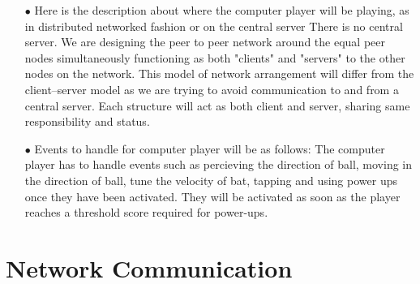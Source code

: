 \documentclass[10pt]{asme2ej}
\begin{document}
\begin{itemize}
 \item [$\bullet$]
 Here is the description about where the computer player will be playing, as in distributed networked fashion or on the central server There is no central server. We are designing the peer to peer network around the equal peer nodes simultaneously functioning as both "clients" and "servers" to the other nodes on the network.  This model of network arrangement will differ from the client–server model as we are trying to avoid communication to and from a central server. Each structure will act as both client and server, sharing same responsibility and status.\newline
 
 \item [$\bullet$]Events to handle for computer player will be as follows:\newline
 The computer player has to handle events such as percieving the direction of ball, moving in the direction of ball, tune the velocity of bat, tapping and using power ups once they have been activated. They will be activated as soon as the player reaches a threshold score required for power-ups.

\end{itemize}
\section{Network Communication}
\end{document}
